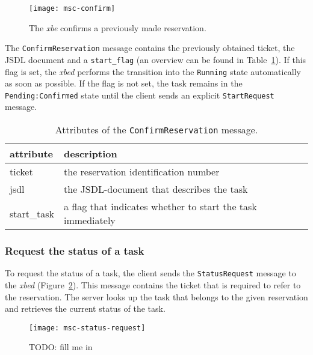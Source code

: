 \begin{figure}[ht]
  \centering
  \texttt{[image: msc-confirm]}
  \caption[MSC Confirm  Reservation]{The \emph{xbe} confirms  a previously
    made reservation.}
  \label{fig:msc-confirm}
\end{figure}

The \texttt{ConfirmReservation}  message contains the  previously obtained
ticket, the JSDL  document and a \texttt{start\_flag} (an  overview can be
found  in Table~\ref{tab:msg:confirm-reservation}). If  this flag  is set,
the \emph{xbed}  performs the  transition into the  \texttt{Running} state
automatically  as soon  as possible.   If the  flag is  not set,  the task
remains in the \texttt{Pending:Confirmed}  state until the client sends an
explicit \texttt{StartRequest} message.

\bigskip

\begin{table}[ht]
  \centering
  \begin{tabular}{@{}lp{}@{}}\toprule
    attribute        & \multicolumn{1}{l}{description} \\ \midrule %
    ticket           &  the reservation identification number \\
    jsdl             & the JSDL-document that describes the task \\
    start\_task      & a flag that indicates whether to start the task immediately  \\
    \bottomrule
  \end{tabular}
  \caption{Attributes of the \texttt{ConfirmReservation} message.}
  \label{tab:msg:confirm-reservation}
\end{table}

\subsubsection{Request the status of a task}

To   request   the   status   of    a   task,   the   client   sends   the
\texttt{StatusRequest}       message        to       the       \emph{xbed}
(Figure~\ref{fig:msc-status-request}).   This message contains  the ticket
that is  required to refer  to the reservation.   The server looks  up the
task  that belongs  to the  given  reservation and  retrieves the  current
status of the task.

\begin{figure}[ht]
  \centering
  \texttt{[image: msc-status-request]}
  \caption[MSC Request Task Status]{TODO: fill me in}
  \label{fig:msc-status-request}
\end{figure}

